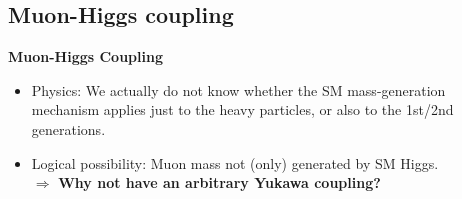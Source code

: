 \documentclass[aspectratio=169]{beamer}
\begin{document}
\subsection{Muon-Higgs coupling}
\begin{frame}
	\vspace{6mm}
	\centering
	\textcolor{PittRoyal}{{\Huge \bf Muon-Higgs Coupling }}
	\vspace{5mm}
	\begin{itemize}
		\item Physics: We actually do not know whether the SM mass-generation mechanism
		applies just to the heavy particles, or also to the 1st/2nd generations.
		\item Logical possibility: Muon mass not (only) generated by SM Higgs.\\
		$\Rightarrow$ \textcolor{PittRoyal}{\bf Why not have an arbitrary Yukawa coupling?}
	\end{itemize}
\end{frame}
\end{document}

